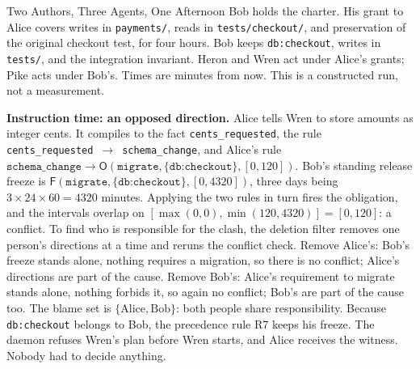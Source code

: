 

\begin{pdexample}{Two Authors, Three Agents, One Afternoon}
\setlength{\parskip}{4pt plus 1pt}
Bob holds the charter. His grant to Alice covers writes in \texttt{payments/},
reads in \texttt{tests/checkout/}, and preservation of the original checkout
test, for four hours. Bob keeps \texttt{db:checkout}, writes in
\texttt{tests/}, and the integration invariant. Heron and Wren act under
Alice's grants; Pike acts under Bob's. Times are minutes from now. This is a
constructed run, not a measurement.

\textbf{Instruction time: an opposed direction.} Alice tells Wren to store
amounts as integer cents. It compiles to the fact \texttt{cents\_requested},
the rule \texttt{cents\_requested}~$\to$~\texttt{schema\_change}, and
Alice's rule $\texttt{schema\_change}\to
\mathsf O(\texttt{migrate},\{\texttt{db:checkout}\},[0,120])$. Bob's standing
release freeze is $\mathsf F(\texttt{migrate},\{\texttt{db:checkout}\},
[0,4320])$, three days being $3\times24\times60=4320$ minutes. Applying the
two rules in turn fires the obligation, and the intervals overlap on
$[\max(0,0),\min(120,4320)]=[0,120]$: a conflict. To find who is responsible
for the clash, the deletion filter removes one person's directions at a time
and reruns the conflict check. Remove Alice's: Bob's freeze stands alone,
nothing requires a migration, so there is no conflict; Alice's directions are
part of the cause. Remove Bob's: Alice's requirement to migrate stands alone,
nothing forbids it, so again no conflict; Bob's are part of the cause too. The
blame set is $\{\text{Alice},\text{Bob}\}$: both people share responsibility.
Because \texttt{db:checkout} belongs to Bob, the precedence rule R7 keeps his
freeze. The daemon refuses Wren's plan before Wren
starts, and Alice receives the witness. Nobody had to decide anything.


\end{pdexample}
